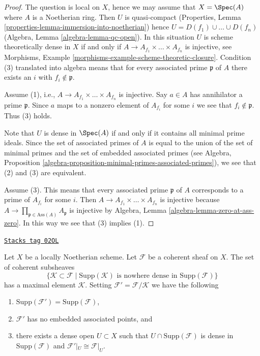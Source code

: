 \begin{proof}
The question is local on $X$, hence we may assume that $X = \Spec(A)$
where $A$ is a Noetherian ring. Then $U$ is quasi-compact
(Properties, Lemma \ref{properties-lemma-immersion-into-noetherian})
hence $U = D(f_1) \cup \ldots \cup D(f_n)$
(Algebra, Lemma \ref{algebra-lemma-qc-open}).
In this situation $U$ is scheme theoretically dense in $X$ if and only if
$A \to A_{f_1} \times \ldots \times A_{f_n}$ is injective, see
Morphisms, Example \ref{morphisms-example-scheme-theoretic-closure}.
Condition (3) translated into algebra means that for every associated
prime $\mathfrak p$ of $A$ there exists an $i$ with $f_i \not \in \mathfrak p$.

\medskip\noindent
Assume (1), i.e., $A \to A_{f_1} \times \ldots \times A_{f_n}$ is injective.
Say $a \in A$ has annihilator a prime $\mathfrak p$. Since $a$ maps
to a nonzero element of $A_{f_i}$ for some $i$ we see that
$f_i \not \in \mathfrak p$. Thus (3) holds.

\medskip\noindent
Note that $U$ is dense in $\Spec(A)$ if and only if it contains all
minimal prime ideals. Since the set of associated primes
of $A$ is equal to the union of the set of minimal primes and the
set of embedded associated primes (see Algebra, Proposition
\ref{algebra-proposition-minimal-primes-associated-primes}),
we see that (2) and (3) are equivalent.

\medskip\noindent
Assume (3). This means that every associated prime $\mathfrak p$ of $A$
corresponds to a prime of $A_{f_i}$ for some $i$. Then
$A \to A_{f_1} \times \ldots \times A_{f_n}$ is injective because
$A \to \prod_{\mathfrak p \in \text{Ass}(A)} A_\mathfrak p$ is injective
by Algebra, Lemma \ref{algebra-lemma-zero-at-ass-zero}. In this way
we see that (3) implies (1).
\end{proof}

\begin{lemma}
\label{divisors-lemma-remove-embedded-points}
\href{https://stacks.math.columbia.edu/tag/02OL}{\texttt{Stacks tag 02OL}}

Let $X$ be a locally Noetherian scheme.
Let $\mathcal{F}$ be a coherent sheaf on $X$.
The set of coherent subsheaves
$$
\{
\mathcal{K} \subset \mathcal{F}
\mid
\text{Supp}(\mathcal{K})\text{ is nowhere dense in }\text{Supp}(\mathcal{F})
\}
$$
has a maximal element $\mathcal{K}$.
Setting $\mathcal{F}' = \mathcal{F}/\mathcal{K}$ we have the
following
\begin{enumerate}
\item $\text{Supp}(\mathcal{F}') = \text{Supp}(\mathcal{F})$,
\item $\mathcal{F}'$ has no embedded associated points, and
\item there exists a dense open $U \subset X$ such that
$U \cap \text{Supp}(\mathcal{F})$ is dense in $\text{Supp}(\mathcal{F})$
and $\mathcal{F}'|_U \cong \mathcal{F}|_U$.
\end{enumerate}
\end{lemma}


